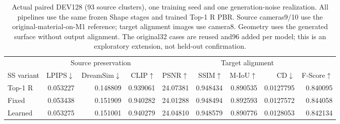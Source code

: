 \begin{table}[t]
\centering\small
\setlength{\tabcolsep}{3.5pt}
\begin{tabular}{lrrrrrrrr}
\toprule
&\multicolumn{3}{c}{Source preservation}&\multicolumn{5}{c}{Target alignment}\\
SS variant&LPIPS$\downarrow$&DreamSim$\downarrow$&CLIP$\uparrow$&PSNR$\uparrow$&SSIM$\uparrow$&M-IoU$\uparrow$&CD$\downarrow$&F-Score$\uparrow$\\
\midrule
Top-1 R&0.053227&0.148809&0.939061&24.07381&0.948434&0.890535&0.0127795&0.840095\\
Fixed&0.053438&0.151909&0.940282&24.01288&0.948494&0.892593&0.0127572&0.844058\\
Learned&0.053275&0.151001&0.940279&24.04810&0.948579&0.890776&0.0128053&0.842134\\
\bottomrule
\end{tabular}
\caption{Actual paired DEV128 (93 source clusters), one training seed and one
generation-noise realization. All pipelines use the same frozen Shape stages
and trained Top-1 R PBR. Source cameras9/10 use the original-material-on-M1
reference; target alignment images use camera8. Geometry uses the generated
surface without output alignment. The original32 cases are reused and96
added per model; this is an exploratory extension, not held-out confirmation.}
\label{tab:dev-joint128}
\end{table}
